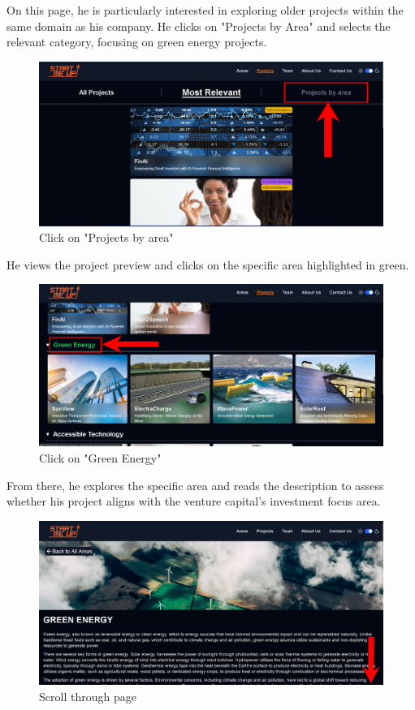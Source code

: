 \documentclass[11pt, letterpaper]{article}
\begin{document}
\noindent
On this page, he is particularly interested in exploring older projects within the same domain as his company. He clicks on "Projects by Area" and selects the relevant category, focusing on green energy projects.
\begin{figure}[H]
    \centering
    \includegraphics[width=16cm]{images/Scenarios/Scenario 1/Screen3.png}
    \caption{Click on "Projects by area"}
    \label{fig:scenario1_3}
\end{figure}
\noindent
He views the project preview and clicks on the specific area highlighted in green.
\begin{figure}[H]
    \centering
    \includegraphics[width=16cm]{images/Scenarios/Scenario 1/Screen4.png}
    \caption{Click on "Green Energy"}
    \label{fig:scenario1_4}
\end{figure}
\noindent
From there, he explores the specific area and reads the description to assess whether his project aligns with the venture capital's investment focus area.
\begin{figure}[H]
    \centering
    \includegraphics[width=16cm]{images/Scenarios/Scenario 1/Screen5.png}
    \caption{Scroll through page}
    \label{fig:scenario1_5}
\end{figure}
\end{document}
